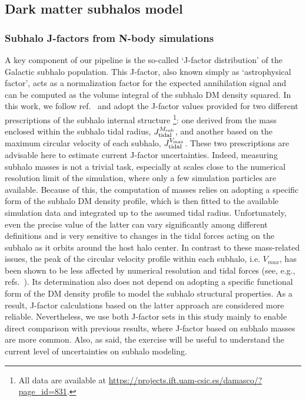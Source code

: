 \subsection{Dark matter subhalos model}
\label{sec:DM_model_chapter}

\subsubsection{Subhalo J-factors from N-body simulations}
\label{sec:sim-jfactor}
A key component of our pipeline is the so-called ‘J-factor distribution’ of the Galactic subhalo population. This J-factor, also known simply as ‘astrophysical factor’, acts as a normalization factor for the expected annihilation signal and can be computed as the volume integral of the subhalo DM density squared. In this work, we follow ref.~\cite{2024MNRAS.530.2496A} and adopt the J-factor values provided for two different prescriptions of the subhalo internal structure%
\footnote{All data are available at \url{https://projects.ift.uam-csic.es/damasco/?page_id=831}.}: one derived from the mass enclosed within the subhalo tidal radius, $J_{\rm tidal}^{M_\textrm{sub}}$, and another based on the maximum circular velocity of each subhalo, $J_{\rm tidal}^{V_\textrm{max}}$. 
These two prescriptions are advisable here to estimate current J-factor uncertainties. 
Indeed, measuring subhalo masses is not a trivial task, especially at scales close to the numerical resolution limit of the simulation, where only a few simulation particles are available. Because of this, the computation of masses relies on adopting a specific form of the subhalo DM density profile, which is then fitted to the available simulation data and integrated up to the assumed tidal radius. Unfortunately, even the precise value of the latter can vary significantly among different definitions and is very sensitive to changes in the tidal forces acting on the subhalo as it orbits around the host halo center. In contrast to these mass-related issues, the peak of the circular velocity profile within each subhalo, i.e. $V_{max}$, has been shown to be less affected by numerical resolution and tidal forces (see, e.g., refs.~\cite{2024MNRAS.530.2496A,2025arXiv250601152A}). Its determination also does not depend on adopting a specific functional form of the DM density profile to model the subhalo structural properties. As a result, J-factor calculations based on the latter approach are considered more reliable. Nevertheless, we use both J-factor sets in this study mainly to enable direct comparison with previous results, where J-factor based on subhalo masses are more common. Also, as said, the exercise will  be useful to understand the current level of uncertainties on subhalo modeling.


